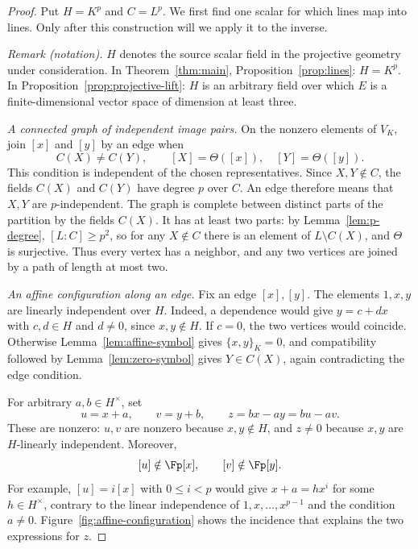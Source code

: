 \begin{proof}
Put $H=K^p$ and $C=L^p$.  We first find one scalar for which lines map
into lines.  Only after this construction will we apply it to the inverse.

\noindent\textit{Remark (notation).} $H$ denotes the source scalar field in the projective geometry under consideration. In Theorem~\ref{thm:main}, Proposition~\ref{prop:lines}: $H=K^p$. In Proposition~\ref{prop:projective-lift}: $H$ is an arbitrary field over which $E$ is a finite-dimensional vector space of dimension at least three.


\smallskip
\noindent\emph{A connected graph of independent image pairs.}
On the nonzero elements of $V_K$, join $[x]$ and $[y]$ by an edge when
\[
 C(X)\ne C(Y),\qquad [X]=\Theta([x]),\quad [Y]=\Theta([y]).
\]
This condition is independent of the chosen representatives.  Since
$X,Y\notin C$, the fields $C(X)$ and $C(Y)$ have degree $p$ over $C$.
An edge therefore means that $X,Y$ are $p$-independent.
The graph is complete between distinct parts of the partition by the
fields $C(X)$.  It has at least two parts: by Lemma~\ref{lem:p-degree},
$[L:C]\ge p^2$, so for any $X\notin C$ there is an element of
$L\setminus C(X)$, and $\Theta$ is surjective.  Thus every vertex has a
neighbor, and any two vertices are joined by a path of length at most two.

\smallskip
\noindent\emph{An affine configuration along an edge.}
Fix an edge $[x],[y]$.  The elements $1,x,y$ are linearly independent
over $H$.  Indeed, a dependence would give $y=c+dx$ with $c,d\in H$
and $d\ne0$, since $x,y\notin H$.  If $c=0$, the two vertices would
coincide.  Otherwise Lemma~\ref{lem:affine-symbol} gives
$\{x,y\}_K=0$, and compatibility followed by
Lemma~\ref{lem:zero-symbol} gives $Y\in C(X)$, again contradicting
the edge condition.

For arbitrary $a,b\in H^\times$, set
\begin{equation}\label{eq:affine-configuration}
 u=x+a,\qquad v=y+b,\qquad z=bx-ay=bu-av.
\end{equation}
These are nonzero: $u,v$ are nonzero because $x,y\notin H$, and
$z\ne0$ because $x,y$ are $H$-linearly independent.  Moreover,
\begin{equation}\label{eq:nonmonomial-source}
 [u]\notin\Fp[x],\qquad [v]\notin\Fp[y].
\end{equation}
For example, $[u]=i[x]$ with $0\le i<p$ would give
$x+a=h x^i$ for some $h\in H^\times$, contrary to the linear
independence of $1,x,\ldots,x^{p-1}$ and the condition $a\ne0$.
Figure~\ref{fig:affine-configuration} shows the incidence that explains
the two expressions for $z$.


\end{proof}
